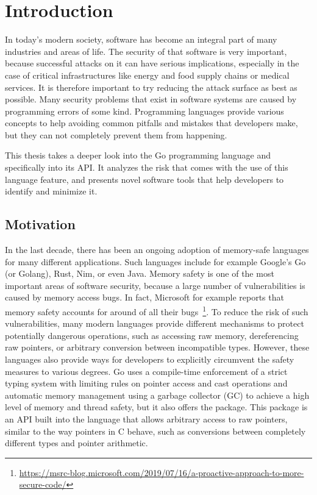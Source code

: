 
\chapter{Introduction}\label{ch:introduction}

In today's modern society, software has become an integral part of many industries and areas of life.
The security of that software is very important, because successful attacks on it can have serious implications,
especially in the case of critical infrastructures like energy and food supply chains or medical services.
It is therefore important to try reducing the attack surface as best as possible.
Many security problems that exist in software systems are caused by programming errors of some kind.
Programming languages provide various concepts to help avoiding common pitfalls and mistakes that developers make, but
they can not completely prevent them from happening.

This thesis takes a deeper look into the Go programming language and specifically into its \unsafe{} \acrshort{API}.
It analyzes the risk that comes with the use of this language feature, and presents novel software tools that help
developers to identify and minimize it.



\section{Motivation}\label{sec:motivation}

In the last decade, there has been an ongoing adoption of memory-safe languages for many different applications.
Such languages include for example Google's Go (or Golang), Rust, Nim, or even Java.
Memory safety is one of the most important areas of software security, because a large number of vulnerabilities is
caused by memory access bugs.
In fact, Microsoft for example reports that memory safety accounts for around  of all their
bugs~\footnote{\scriptsize\url{https://msrc-blog.microsoft.com/2019/07/16/a-proactive-approach-to-more-secure-code/}}.
To reduce the risk of such vulnerabilities, many modern languages provide different mechanisms to protect potentially
dangerous operations, such as accessing raw memory, dereferencing raw pointers, or arbitrary conversion between
incompatible types.
However, these languages also provide ways for developers to explicitly circumvent the safety measures to various
degrees.
Go uses a compile-time enforcement of a strict typing system with limiting rules on pointer access and cast operations
and automatic memory management using a garbage collector (\acrshort{GC}) to achieve a high level of memory and thread
safety, but it also offers the \unsafe{} package.
This package is an \acrshort{API} built into the language that allows arbitrary access to raw pointers, similar to the
way pointers in C behave, such as conversions between completely different types and pointer arithmetic.

